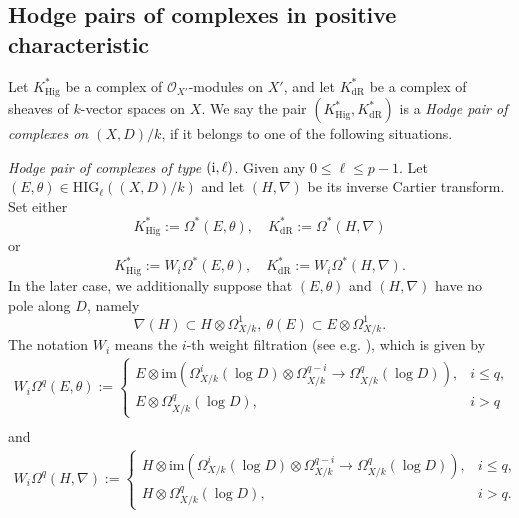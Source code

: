 \documentclass[12pt, a4paper]{article}
\begin{document}
\subsection{Hodge pairs of complexes in positive characteristic}

Let $K^*_\mathrm{Hig}$ be a complex of $\mathcal O_{X'}$-modules on $X'$, and let
$K^*_\mathrm{dR}$ be a complex of sheaves of $k$-vector spaces on $X$. We say the pair  $(K^*_\mathrm{Hig},K^*_\mathrm{dR})$ is a \emph{Hodge pair of complexes on $(X,D)/k$}, if it belongs to one of the following situations.


\emph{Hodge pair of complexes of type $(\mathrm{\uppercase\expandafter{\romannumeral1}},\ell)$}.
Given any $0\leq\ell\leq p-1$. Let $(E,\theta)\in\mathrm{HIG}_\ell((X,D)/k)$ and let $(H,\nabla)$ be its inverse Cartier transform.  Set either 
$$
K^*_{\mathrm{Hig}}:=\Omega^*(E,\theta),\quad
K^*_{\mathrm{dR}}:=\Omega^*(H,\nabla) $$
or
$$
K^*_{\mathrm{Hig}}:=W_i\Omega^*(E,\theta),\quad
K^*_{\mathrm{dR}}:=W_i\Omega^*(H,\nabla).
$$
In the later case, we additionally suppose that $(E,\theta)$ and $(H,\nabla)$ have no pole along $D$, namely
    $$
    \nabla(H)\subset H\otimes\Omega^1_{X/k},~\theta(E)\subset E\otimes\Omega^1_{X/k}.
    $$
 The notation $W_i$ means the $i$-th weight filtration (see e.g. \cite[Definition 8.3.19]{CEGT}), which is given by
 $$
 \begin{array}{c}
 W_i\Omega^q(E,\theta):=\left\{\begin{matrix}E\otimes\mathrm{im}(\Omega_{X/k}^i(\log D)\otimes\Omega^{q-i}_{X/k}\to\Omega_{X/k}^q(\log D)),&i\leq q,\\
E\otimes\Omega_{X/k}^q(\log D),&i>q
 \end{matrix}\right.\\
 \end{array}
 $$
 and
 $$
 \begin{array}{c}
 W_i\Omega^q(H,\nabla):=\left\{\begin{matrix}H\otimes\mathrm{im}(\Omega_{X/k}^i(\log D)\otimes\Omega^{q-i}_{X/k}\to\Omega_{X/k}^q(\log D)),&i\leq q,\\
H\otimes\Omega_{X/k}^q(\log D),&i>q.
 \end{matrix}\right.\\
 \end{array} $$
\end{document}
